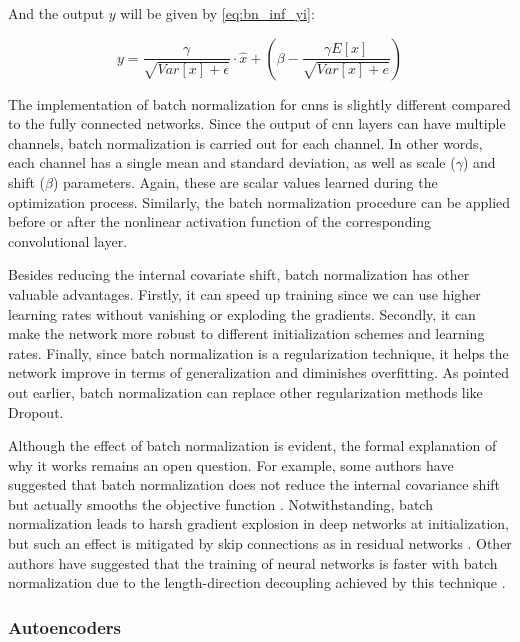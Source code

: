 And the output $y$ will be given by \autoref{eq:bn_inf_yi}:

\begin{equation}
\label{eq:bn_inf_yi}
y = \frac{\gamma}{\sqrt{Var[x] + \epsilon}} \cdot \hat{x} + \left( \beta - \frac{\gamma E[x]}{\sqrt{Var[x] + e}} \right)
\end{equation}

The implementation of batch normalization for \aclp{cnn} is slightly different compared to the fully connected networks. Since the output of \acs{cnn} layers can have multiple channels, batch normalization is carried out for each channel. In other words, each channel has a single mean and standard deviation, as well as scale ($\gamma$) and shift ($\beta$) parameters. Again, these are scalar values learned during the optimization process. Similarly, the batch normalization procedure can be applied before or after the nonlinear activation function of the corresponding convolutional layer.

Besides reducing the internal covariate shift, batch normalization has other valuable advantages. Firstly, it can speed up training since we can use higher learning rates without vanishing or exploding the gradients. Secondly, it can make the network more robust to different initialization schemes and learning rates. Finally, since batch normalization is a regularization technique, it helps the network improve in terms of generalization and diminishes overfitting. As pointed out earlier, batch normalization can replace other regularization methods like Dropout.

Although the effect of batch normalization is evident, the formal explanation of why it works remains an open question. For example, some authors have suggested that batch normalization does not reduce the internal covariance shift but actually smooths the objective function \citep{santurkar2018does}. Notwithstanding, batch normalization leads to harsh gradient explosion in deep networks at initialization, but such an effect is mitigated by skip connections as in residual networks \citep{yang2019mean}. Other authors have suggested that the training of neural networks is faster with batch normalization due to the length-direction decoupling achieved by this technique \citep{kohler2019exponential}.

\subsubsection{Autoencoders}

